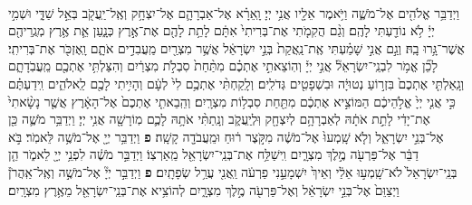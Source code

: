 \documentclass[twoside, openany, parskip=half, 11pt]{book}
\begin{document}
\begin{footnotesize}
\begin{multicols}{2}
\\
 וַיְדַבֵּ֥ר אֱלֹהִ֖ים אֶל־מֹשֶׁ֑ה וַיֹּ֥אמֶר אֵלָ֖יו אֲנִ֥י יְיָ׃ וָֽאֵרָ֗א אֶל־אַבְרָהָ֛ם אֶל־יִצְחָ֥ק וְאֶֽל־יַֽעֲקֹ֖ב בְּאֵ֣ל שַׁדָּ֑י וּשְׁמִ֣י יְיָ֔ לֹ֥א נוֹדַ֖עְתִּי לָהֶֽם׃ וְגַ֨ם הֲקִמֹ֤תִי אֶת־בְּרִיתִי֙ אִתָּ֔ם לָתֵ֥ת לָהֶ֖ם אֶת־אֶ֣רֶץ כְּנָ֑עַן אֵ֛ת אֶ֥רֶץ מְגֻֽרֵיהֶ֖ם אֲשֶׁר־גָּ֥רוּ בָֽהּ׃ וְגַ֣ם אֲנִ֣י שָׁמַ֗עְתִּי אֶֽת־נַֽאֲקַת֙ בְּנֵ֣י יִשְׂרָאֵ֔ל אֲשֶׁ֥ר מִצְרַ֖יִם מַֽעֲבִדִ֣ים אֹתָ֑ם וָֽאֶזְכֹּ֖ר אֶת־בְּרִיתִֽי׃  לָכֵ֞ן אֱמֹ֥ר לִבְנֵֽי־יִשְׂרָאֵל֘ אֲנִ֣י יְיָ֒ וְהֽוֹצֵאתִ֣י אֶתְכֶ֗ם מִתַּ֨חַת֙ סִבְלֹ֣ת מִצְרַ֔יִם וְהִצַּלְתִּ֥י אֶתְכֶ֖ם מֵֽעֲבֹֽדָתָ֑ם וְגָֽאַלְתִּ֤י אֶתְכֶם֙ בִּזְר֣וֹעַ נְטוּיָ֔ה וּבִשְׁפָטִ֖ים גְּדֹלִֽים׃ וְלָֽקַחְתִּ֨י אֶתְכֶ֥ם לִי֙ לְעָ֔ם וְהָיִ֥יתִי לָכֶ֖ם לֵֽאלֹהִ֑ים וִֽידַעְתֶּ֗ם כִּ֣י אֲנִ֤י יְיָ֙ אֱלֹ֣הֵיכֶ֔ם הַמּוֹצִ֣יא אֶתְכֶ֔ם מִתַּ֖חַת סִבְל֥וֹת מִצְרָֽיִם׃ וְהֵֽבֵאתִ֤י אֶתְכֶם֙ אֶל־הָאָ֔רֶץ אֲשֶׁ֤ר נָשָׂ֨אתִי֙ אֶת־יָדִ֔י לָתֵ֣ת אֹתָ֔הּ לְאַבְרָהָ֥ם לְיִצְחָ֖ק וּֽלְיַֽעֲקֹ֑ב וְנָֽתַתִּ֨י אֹתָ֥הּ לָכֶ֛ם מֽוֹרָשָׁ֖ה אֲנִ֥י יְיָ׃ וַיְדַבֵּ֥ר מֹשֶׁ֛ה כֵּ֖ן אֶל־בְּנֵ֣י יִשְׂרָאֵ֑ל וְלֹ֤א שָֽׁמְעוּ֙ אֶל־מֹשֶׁ֔ה מִקֹּ֣צֶר ר֔וּחַ וּמֵֽעֲבֹדָ֖ה קָשָֽׁה׃ \textbf{פ} 
 וַיְדַבֵּ֥ר יְיָ֖ אֶל־מֹשֶׁ֥ה לֵּאמֹֽר׃ בֹּ֣א דַבֵּ֔ר אֶל־פַּרְעֹ֖ה מֶ֣לֶךְ מִצְרָ֑יִם וִֽישַׁלַּ֥ח אֶת־בְּנֵֽי־יִשְׂרָאֵ֖ל מֵֽאַרְצֽוֹ׃ וַיְדַבֵּ֣ר מֹשֶׁ֔ה לִפְנֵ֥י יְיָ֖ לֵאמֹ֑ר הֵ֤ן בְּנֵֽי־יִשְׂרָאֵל֙ לֹא־שָֽׁמְע֣וּ אֵלַ֔י וְאֵיךְ֙ יִשְׁמָעֵ֣נִי פַרְעֹ֔ה וַֽאֲנִ֖י עֲרַ֥ל שְׂפָתָֽיִם׃ \textbf{פ} 
וַיְדַבֵּ֣ר יְיָ֘ אֶל־מֹשֶׁ֣ה וְאֶֽל־אַֽהֲרֹן֒ וַיְצַוֵּם֙ אֶל־בְּנֵ֣י יִשְׂרָאֵ֔ל וְאֶל־פַּרְעֹ֖ה מֶ֣לֶךְ מִצְרָ֑יִם לְהוֹצִ֥יא אֶת־בְּנֵֽי־יִשְׂרָאֵ֖ל מֵאֶ֥רֶץ מִצְרָֽיִם׃


\end{multicols}
\end{footnotesize}
\end{document}
